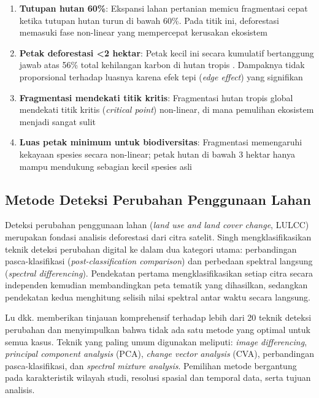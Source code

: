 \documentclass[12pt,a4paper]{article}
\begin{document}
\begin{enumerate}[nosep]
    \item \textbf{Tutupan hutan 60\%}: Ekspansi lahan pertanian memicu fragmentasi
          cepat ketika tutupan hutan turun di bawah 60\%. Pada titik ini,
          deforestasi memasuki fase non-linear yang mempercepat kerusakan ekosistem
          \cite{gupta2025fragmentation}
    \item \textbf{Petak deforestasi <2 hektar}: Petak kecil ini secara kumulatif
          bertanggung jawab atas 56\% total kehilangan karbon di hutan tropis
          \cite{xu2026nature}. Dampaknya tidak proporsional terhadap luasnya karena
          efek tepi (\textit{edge effect}) yang signifikan
    \item \textbf{Fragmentasi mendekati titik kritis}: Fragmentasi hutan tropis
          global mendekati titik kritis (\textit{critical point}) non-linear,
          di mana pemulihan ekosistem menjadi sangat sulit \cite{taubert2018fragmentation}
    \item \textbf{Luas petak minimum untuk biodiversitas}: Fragmentasi memengaruhi
          kekayaan spesies secara non-linear; petak hutan di bawah 3 hektar hanya
          mampu mendukung sebagian kecil spesies asli \cite{flaspohler2010fragmentation}
\end{enumerate}

\subsection{Metode Deteksi Perubahan Penggunaan Lahan}
\label{subsec:lulcc}

Deteksi perubahan penggunaan lahan (\textit{land use and land cover
change}, LULCC) merupakan fondasi analisis deforestasi dari citra
satelit. Singh \cite{singh1989change} mengklasifikasikan teknik
deteksi perubahan digital ke dalam dua kategori utama:
perbandingan pasca-klasifikasi (\textit{post-classification
comparison}) dan perbedaan spektral langsung (\textit{spectral
differencing}). Pendekatan pertama mengklasifikasikan setiap citra
secara independen kemudian membandingkan peta tematik yang
dihasilkan, sedangkan pendekatan kedua menghitung selisih nilai
spektral antar waktu secara langsung.

Lu dkk. \cite{lu2004change} memberikan tinjauan komprehensif
terhadap lebih dari 20 teknik deteksi perubahan dan menyimpulkan
bahwa tidak ada satu metode yang optimal untuk semua kasus.
Teknik yang paling umum digunakan meliputi:
\textit{image differencing}, \textit{principal component analysis}
(PCA), \textit{change vector analysis} (CVA), perbandingan
pasca-klasifikasi, dan \textit{spectral mixture analysis}.
Pemilihan metode bergantung pada karakteristik wilayah studi,
resolusi spasial dan temporal data, serta tujuan analisis.
\end{document}
